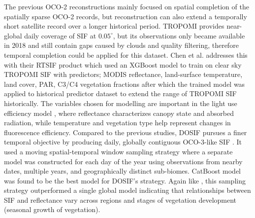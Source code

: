 The previous OCO-2 reconstructions mainly focused on spatial completion of the spatially sparse OCO-2 records, but reconstruction can also extend a temporally short satellite record over a longer historical period. TROPOMI provides near-global daily coverage of SIF at $0.05^{\circ}$, but its observations only became available in 2018 and still contain gaps caused by clouds and quality filtering, therefore temporal completion could be applied for this dataset. Chen et al. \cite{chen2022long} addresses this with their RTSIF product which used an XGBoost model to train on clear sky TROPOMI SIF with predictors; MODIS reflectance, land-surface temperature, land cover, PAR, C3/C4 vegetation fractions after which the trained model was applied to historical predictor dataset to extend the range of TROPOMI SIF historically. The variables chosen for modelling are important in the light use efficiency model \cite{liu2020estimating}, where reflectance characterizes canopy state and absorbed radiation, while temperature and vegetation type help represent changes in fluorescence efficiency. Compared to the previous studies, DOSIF pursues a finer temporal objective by producing daily, globally contiguous OCO-3-like SIF \cite{yu2025dosif}. It used a moving spatial-temporal window sampling strategy where a separate model was constructed for each day of the year using observations from nearby dates, multiple years, and geographically distinct sub-biomes. CatBoost model was found to be the best model for DOSIF's strategy. Again like \cite{yu2019high}, this sampling strategy outperformed a single global model indicating that relationships between SIF and reflectance vary across regions and stages of vegetation development (seasonal growth of vegetation). 

